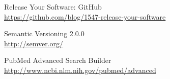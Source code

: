  Release Your Software: GitHub \\
\url{https://github.com/blog/1547-release-your-software}

 Semantic Versioning 2.0.0 \\
\url{http://semver.org/}

 PubMed Advanced Search Builder \\
\url{http://www.ncbi.nlm.nih.gov/pubmed/advanced}
